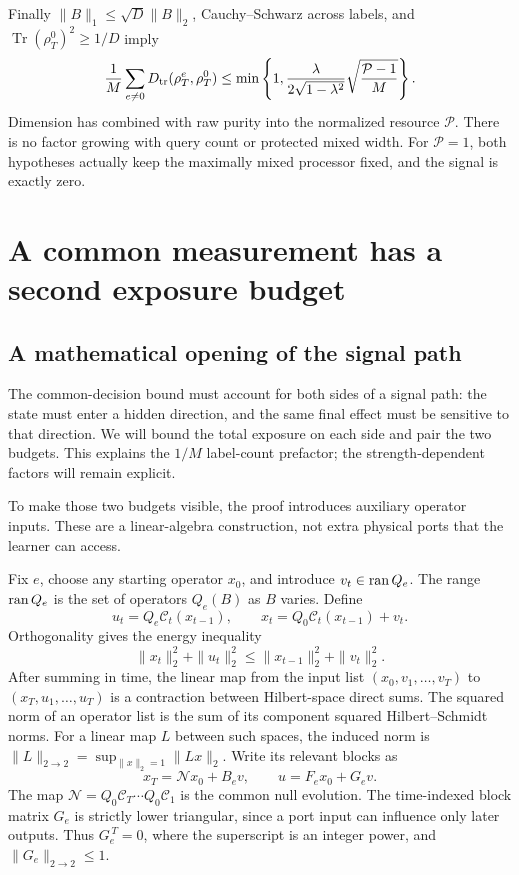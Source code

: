 \documentclass[11pt,a4paper]{article}
\numberwithin{equation}{section}
\theoremstyle{definition}
\theoremstyle{remark}
\DeclareMathOperator{\Tr}{Tr}
\begin{document}
Finally $\|B\|_1\leq\sqrt{D}\|B\|_2$,
Cauchy--Schwarz across labels, and
$\Tr(\rho_T^0)^2\geq1/D$ imply
\begin{equation}
 \frac1M\sum_{e\ne0} D_{\rm tr}(\rho_T^e,\rho_T^0)
 \leq
 \min\left\{1,\frac{\lambda}{2\sqrt{1-\lambda^2}}
                      \sqrt{\frac{\mathcal P-1}{M}}\right\}.
 \label{q:individual-bound}
\end{equation}
Dimension has combined with raw purity into the normalized resource
$\mathcal P$. There is no factor growing with query count or protected mixed
width. For $\mathcal P=1$, both hypotheses actually keep the maximally mixed
processor fixed, and the signal is exactly zero.

\section{A common measurement has a second exposure budget}

\subsection{A mathematical opening of the signal path}

The common-decision bound must account for both sides of a signal path:
the state must enter a hidden direction, and the same final effect must be
sensitive to that direction. We will bound the total exposure on each side
and pair the two budgets. This explains the $1/M$ label-count prefactor;
the strength-dependent factors will remain explicit.

To make those two budgets visible, the proof introduces auxiliary operator
inputs. These are a linear-algebra construction, not extra physical ports
that the learner can access.

Fix $e$, choose any starting operator $x_0$, and introduce
$v_t\in{\rm ran}\,Q_e$. The range ${\rm ran}\,Q_e$ is the set of operators
$Q_e(B)$ as $B$ varies. Define
\[
 u_t=Q_e\mathcal C_t(x_{t-1}),\qquad
 x_t=Q_0\mathcal C_t(x_{t-1})+v_t.
\]
Orthogonality gives the energy inequality
\begin{equation}
 \|x_t\|_2^2+\|u_t\|_2^2
 \leq\|x_{t-1}\|_2^2+\|v_t\|_2^2 .
 \label{q:port-energy}
\end{equation}
After summing in time, the linear map from the input list
$(x_0,v_1,\ldots,v_T)$ to $(x_T,u_1,\ldots,u_T)$ is a contraction between
Hilbert-space direct sums. The squared norm of an operator list is the sum
of its component squared Hilbert--Schmidt norms. For a linear map $L$
between such spaces, the induced norm is
$\|L\|_{2\to2}=\sup_{\|x\|_2=1}\|Lx\|_2$.
Write its relevant blocks as
\[
 x_T=\mathcal N x_0+B_e v,\qquad u=F_e x_0+G_e v .
\]
The map $\mathcal N=Q_0\mathcal C_T\cdots Q_0\mathcal C_1$ is the common null evolution.
The time-indexed block matrix $G_e$ is strictly lower triangular, since a port
input can influence only later outputs. Thus $G_e^{\,T}=0$, where the
superscript is an integer power, and $\|G_e\|_{2\to2}\leq1$.
\end{document}
